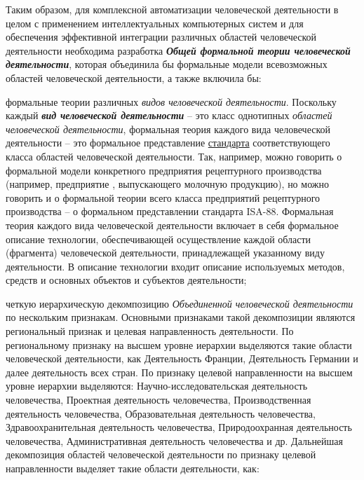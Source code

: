 {Таким образом, для комплексной автоматизации человеческой деятельности в целом с применением интеллектуальных компьютерных систем и для обеспечения эффективной интеграции различных областей человеческой деятельности необходима разработка \textbf{\textit{Общей формальной теории человеческой деятельности}}, которая объединила бы формальные модели всевозможных областей человеческой деятельности, а также включила бы:
\begin{scnitemize}
    \item формальные теории различных \textit{видов человеческой деятельности}. Поскольку каждый \textbf{\textit{вид человеческой деятельности}} -- это класс однотипных \textit{областей человеческой деятельности}, формальная теория каждого вида человеческой деятельности -- это формальное представление \underline{стандарта} соответствующего класса областей человеческой деятельности. Так, например, можно говорить о формальной модели конкретного предприятия рецептурного производства (например, предприятие , выпускающего молочную продукцию), но можно говорить и о формальной теории всего класса предприятий рецептурного производства -- о формальном представлении стандарта ISA-88. Формальная теория каждого вида человеческой деятельности включает в себя формальное описание технологии, обеспечивающей осуществление каждой области (фрагмента) человеческой деятельности, принадлежащей указанному виду деятельности. В описание технологии входит описание используемых методов, средств и основных объектов и субъектов деятельности;
    \item четкую иерархическую декомпозицию \textit{Объединенной человеческой деятельности} по нескольким признакам. Основными признаками такой декомпозиции являются региональный признак и целевая направленность деятельности. По региональному признаку на высшем уровне иерархии выделяются такие области человеческой деятельности, как Деятельность Франции, Деятельность Германии и далее деятельность всех стран. По признаку целевой направленности на высшем уровне иерархии выделяются: Научно-исследовательская деятельность человечества, Проектная деятельность человечества, Производственная деятельность человечества, Образовательная деятельность человечества, Здравоохранительная деятельность человечества, Природоохранная деятельность человечества, Административная деятельность человечества и др. Дальнейшая декомпозиция областей человеческой деятельности по признаку целевой направленности выделяет такие области деятельности, как:
    \begin{scnitemizeii}

\end{scnitemizeii}
\end{scnitemize}}
